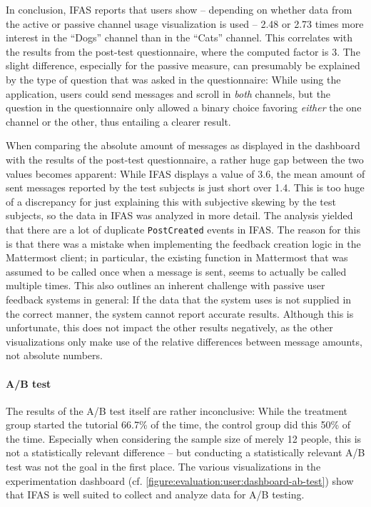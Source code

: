 In conclusion, \ac{IFAS} reports that users show -- depending on whether data from the active or passive channel usage visualization is used -- 2.48 or 2.73 times more interest in the ``Dogs'' channel than in the ``Cats'' channel.
This correlates with the results from the post-test questionnaire, where the computed factor is 3.
The slight difference, especially for the passive measure, can presumably be explained by the type of question that was asked in the questionnaire:
While using the application, users could send messages and scroll in \emph{both} channels, but the question in the questionnaire only allowed a binary choice favoring \emph{either} the one channel or the other, thus entailing a clearer result.

When comparing the absolute amount of messages as displayed in the dashboard with the results of the post-test questionnaire, a rather huge gap between the two values becomes apparent:
While \ac{IFAS} displays a value of 3.6, the mean amount of sent messages reported by the test subjects is just short over 1.4.
This is too huge of a discrepancy for just explaining this with subjective skewing by the test subjects, so the data in \ac{IFAS} was analyzed in more detail.
The analysis yielded that there are a lot of duplicate \texttt{PostCreated} events in \ac{IFAS}.
The reason for this is that there was a mistake when implementing the feedback creation logic in the Mattermost client; in particular, the existing function in Mattermost that was assumed to be called once when a message is sent, seems to actually be called multiple times.
This also outlines an inherent challenge with passive user feedback systems in general: If the data that the system uses is not supplied in the correct manner, the system cannot report accurate results.
Although this is unfortunate, this does not impact the other results negatively, as the other visualizations only make use of the relative differences between message amounts, not absolute numbers.


\paragraph{A/B test}

The results of the A/B test itself are rather inconclusive: While the treatment group started the tutorial 66.7\% of the time, the control group did this 50\% of the time.
Especially when considering the sample size of merely 12 people, this is not a statistically relevant difference -- but conducting a statistically relevant A/B test was not the goal in the first place.
The various visualizations in the experimentation dashboard (cf. \cref{figure:evaluation:user:dashboard-ab-test}) show that \ac{IFAS} is well suited to collect and analyze data for A/B testing.

